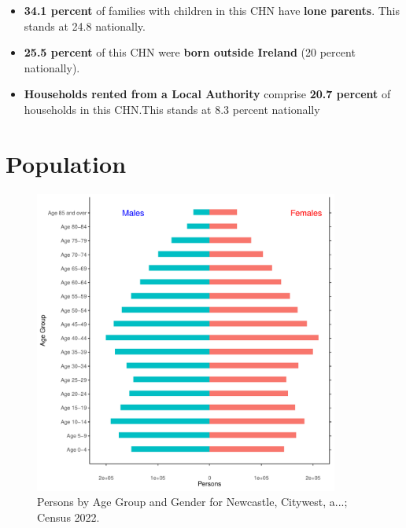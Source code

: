 \documentclass{article}
\begin{document}
\begin{itemize}
\item \textbf{34.1 percent} of families with children in this CHN have \textbf{lone parents}. This stands at 24.8 nationally.

\item \textbf{25.5 percent} of this CHN were \textbf{born outside Ireland} (20 percent nationally).

\item \textbf{Households rented from a Local Authority} comprise \textbf{20.7 percent} of households in this CHN.This stands at 8.3 percent nationally

\end{itemize}

\pagebreak

\section{Population} 
\label{sect:Pop}

\begin{figure}[h]
	\centering
	\includegraphics[width = 100mm]{../figures/PyramidPlot.pdf}
	\caption{Persons by Age Group and Gender for Newcastle, Citywest, a...; Census 2022.}
	\label{fig:2ae19629-1a6a-13a3-e055-000000000001}
	\end{figure}
\end{document}
